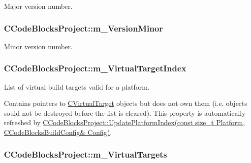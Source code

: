 Major version number. 

\hypertarget{classCCodeBlocksProject_a619d9f24d56855a95bd5b04d76f9a5fe}{
\subsubsection[{m\-\_\-\-Version\-Minor}]{\setlength{\rightskip}{0pt plus 5cm}C\-Code\-Blocks\-Project\-::m\-\_\-\-Version\-Minor\hspace{0.3cm}{\ttfamily [private]}}}\label{classCCodeBlocksProject_a619d9f24d56855a95bd5b04d76f9a5fe}


Minor version number. 

\hypertarget{classCCodeBlocksProject_accfc0de789f0443a8bc5ec4dc8a409bd}{
\subsubsection[{m\-\_\-\-Virtual\-Target\-Index}]{\setlength{\rightskip}{0pt plus 5cm}C\-Code\-Blocks\-Project\-::m\-\_\-\-Virtual\-Target\-Index\hspace{0.3cm}{\ttfamily [private]}}}\label{classCCodeBlocksProject_accfc0de789f0443a8bc5ec4dc8a409bd}


List of virtual build targets valid for a platform. 

Contains pointers to \hyperlink{classCVirtualTarget}{C\-Virtual\-Target} objects but does not own them (i.\-e. objects sould not be destroyed before the list is cleared). This property is automatically refreshed by \hyperlink{classCCodeBlocksProject_a0456bbc2433f541b3409aa0722c9e19c}{C\-Code\-Blocks\-Project\-::\-Update\-Platform\-Index(const size\-\_\-t Platform, C\-Code\-Blocks\-Build\-Config\& Config)}. \hypertarget{classCCodeBlocksProject_aad946890adbdb724f9ae4fd882f07b91}{
\subsubsection[{m\-\_\-\-Virtual\-Targets}]{\setlength{\rightskip}{0pt plus 5cm}C\-Code\-Blocks\-Project\-::m\-\_\-\-Virtual\-Targets\hspace{0.3cm}{\ttfamily [private]}}}\label{classCCodeBlocksProject_aad946890adbdb724f9ae4fd882f07b91}


